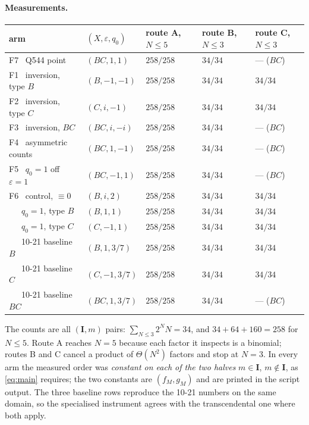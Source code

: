 \documentclass[11pt]{article}
\theoremstyle{definition}
\theoremstyle{remark}
\newcommand{\bI}{\mathbf{I}}
\begin{document}
\paragraph{Measurements.}
\begin{center}\small
\begin{tabular}{llll}
 arm & $(X,\varepsilon,q_0)$ & route A, $N\le5$ & route B, $N\le3$ & route C, $N\le3$\\\hline
 F7 \ Q544 point        & $(BC,1,1)$     & $258/258$ & $34/34$ & --- ($BC$)\\
 F1 \ inversion, type $B$ & $(B,-1,-1)$  & $258/258$ & $34/34$ & $34/34$\\
 F2 \ inversion, type $C$ & $(C,i,-1)$   & $258/258$ & $34/34$ & $34/34$\\
 F3 \ inversion, $BC$     & $(BC,i,-i)$  & $258/258$ & $34/34$ & --- ($BC$)\\
 F4 \ asymmetric counts   & $(BC,1,-1)$  & $258/258$ & $34/34$ & --- ($BC$)\\
 F5 \ $q_0=1$ off $\varepsilon=1$ & $(BC,-1,1)$ & $258/258$ & $34/34$ & --- ($BC$)\\
 F6 \ control, $\equiv0$  & $(B,i,2)$    & $258/258$ & $34/34$ & $34/34$\\
 \ \ \ $q_0=1$, type $B$  & $(B,1,1)$    & $258/258$ & $34/34$ & $34/34$\\
 \ \ \ $q_0=1$, type $C$  & $(C,-1,1)$   & $258/258$ & $34/34$ & $34/34$\\
 \ \ \ 10-21 baseline $B$ & $(B,1,3/7)$  & $258/258$ & $34/34$ & $34/34$\\
 \ \ \ 10-21 baseline $C$ & $(C,-1,3/7)$ & $258/258$ & $34/34$ & $34/34$\\
 \ \ \ 10-21 baseline $BC$& $(BC,1,3/7)$ & $258/258$ & $34/34$ & --- ($BC$)\\
\end{tabular}
\end{center}
The counts are all $(\bI,m)$ pairs: $\sum_{N\le3}2^{N}N=34$, and
$34+64+160=258$ for $N\le5$.  Route A reaches $N=5$ because each factor it inspects is a
binomial; routes B and C cancel a product of $\Theta(N^{2})$ factors and stop at $N=3$.
In every arm
the measured order was \emph{constant on each of the two halves} $m\in\bI$, $m\notin\bI$,
as \eqref{eq:main} requires; the two constants are $(f_M,g_M)$ and are printed in the
script output.  The three baseline rows reproduce the 10-21 numbers on the same domain, so
the specialised instrument agrees with the transcendental one where both apply.
\end{document}
